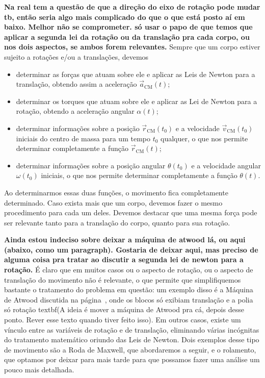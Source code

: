 \textbf{Na real tem a questão de que a direção do eixo de rotação pode mudar tb, então seria algo mais complicado do que o que está posto aí em baixo. Melhor não se comprometer. só usar o papo de que temos que aplicar a segunda lei da rotação ou da translação pra cada corpo, ou nos dois aspectos, se ambos forem relevantes.}
Sempre que um corpo estiver sujeito a rotações e/ou a translações, devemos
\begin{itemize}
    \item determinar as forças que atuam sobre ele e aplicar as Leis de Newton para a translação, obtendo assim a aceleração $\vec{a}_{\text{CM}}(t)$;
    \item determinar os torques que atuam sobre ele e aplicar as Lei de Newton para a rotação, obtendo a aceleração angular $\alpha(t)$;
    \item determinar informações sobre a posição $\vec{r}_{\text{CM}}(t_0)$ e a velocidade $\vec{v}_{\text{CM}}(t_0)$ iniciais do centro de massa para um tempo $t_0$ qualquer, o que nos permite determinar completamente a função $\vec{r}_{\text{CM}}(t)$;
    \item determinar informações sobre a posição angular $\theta(t_0)$ e a velocidade angular $\omega(t_0)$ iniciais, o que nos permite determinar completamente a função $\theta(t)$.
\end{itemize}
%
Ao determinarmos essas duas funções, o movimento fica completamente determinado. Caso exista mais que um corpo, devemos fazer o mesmo procedimento para cada um deles. Devemos destacar que uma mesma força pode ser relevante tanto para a translação do corpo, quanto para sua rotação.

\textbf{Ainda estou indeciso sobre deixar a máquina de atwood lá, ou aqui (abaixo, como um paragraph). Gostaria de deixar aqui, mas preciso de alguma coisa pra tratar ao discutir a segunda lei de newton para a rotação.}
É claro que em muitos casos ou o aspecto de rotação, ou o aspecto de translação do movimento não é relevante, o que permite que simplifiquemos bastante o tratamento do problema em questão: um exemplo disso é a Máquina de Atwood discutida na página~\pageref{Par:AcelMaqAtwood}, onde os blocos só exibiam translação e a polia só rotação textbf{(A ideia é mover a máquina de Atwood pra cá, depois desse ponto. Rever esse texto quando tiver feito isso)}. Em outros casos, existe um vínculo entre as variáveis de rotação e de translação, eliminando várias incógnitas do tratamento matemático oriundo das Leis de Newton. Dois exemplos desse tipo de movimento são a Roda de Maxwell, que abordaremos a seguir, e o rolamento, que optamos por deixar para mais tarde para que possamos fazer uma análise um pouco mais detalhada.

